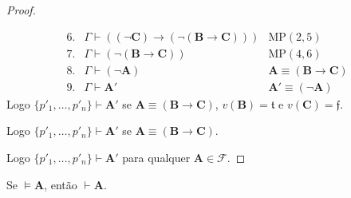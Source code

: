 \begin{proof}
\begin{enumerate}[label=\roman*.]
\begin{itemize}
\[\begin{array}{rll}
                                6. & \Gamma \vdash ((\neg \mathbf{C}) \rightarrow (\neg (\mathbf{B} \rightarrow \mathbf{C}))) & \text{MP}(2,5) \\
                                7. & \Gamma \vdash (\neg (\mathbf{B} \rightarrow \mathbf{C})) & \text{MP}(4,6) \\
                                8. & \Gamma \vdash (\neg \mathbf{A}) & \mathbf{A} \equiv \mathbf{(\mathbf{B} \rightarrow \mathbf{C})} \\
                                9. & \Gamma \vdash \mathbf{A}' & \mathbf{A}' \equiv (\neg \mathbf{A})
                            \end{array}
                        \]
                    Logo $\{p'_1, \ldots, p'_n \} \vdash \mathbf{A}'$ se $\mathbf{A} \equiv (\mathbf{B} \rightarrow \mathbf{C})$, $v(\mathbf{B}) = \mathfrak{t}$ e $v(\mathbf{C}) = \mathfrak{f}$.
                \end{itemize}
            Logo $\{p'_1, \ldots, p'_n \} \vdash \mathbf{A}'$ se $\mathbf{A} \equiv (\mathbf{B} \rightarrow \mathbf{C})$.
        \end{enumerate}
    Logo $\{p'_1, \ldots, p'_n \} \vdash \mathbf{A}'$ para qualquer $\mathbf{A} \in \mathcal{F}$. \blackproof
\end{proof}

\begin{theorem}[da Completude] \label{teo.fund:completudeproposicional}
    Se $\vDash \mathbf{A}$, então $\vdash \mathbf{A}$.
\end{theorem}

